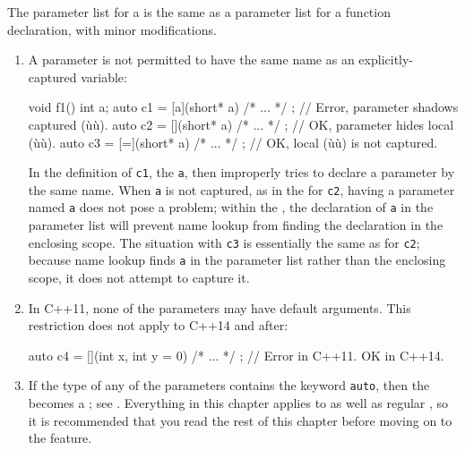 The parameter list for a  is the same as a
parameter list for a function declaration, with minor modifications.

\begin{enumerate}
\item{A parameter is not permitted to have the same name as an explicitly-captured variable:

\begin{emcppslisting}
void f1()
{
    int a;
    auto c1 = [a](short* a){ /* ... */ };  // Error, parameter shadows captured (ù{}ù).
    auto c2 = [](short* a){ /* ... */ };   // OK, parameter hides local (ù{}ù).
    auto c3 = [=](short* a){ /* ... */ };  // OK, local (ù{}ù) is not captured.
}
\end{emcppslisting} 

In the definition of \lstinline!c1!, the 
 \lstinline!a!, then improperly tries to
declare a parameter by the same name. When \lstinline!a! is not captured,
as in the  for \lstinline!c2!, having a parameter
named \lstinline!a! does not pose a problem; within the , the declaration of \lstinline!a! in the parameter list will prevent
name lookup from finding the declaration in the enclosing scope. The
situation with \lstinline!c3! is essentially the same as for \lstinline!c2!;
because name lookup finds \lstinline!a! in the parameter list rather than
the enclosing scope, it does not attempt to capture it.}

\item{In C++11, none of the parameters may have default arguments. This restriction does not apply to C++14 and after:

\begin{emcppslisting}
auto c4 = [](int x, int y = 0){ /* ... */ };  // Error in C++11.  OK in C++14.
\end{emcppslisting}
}

\item{If the type of any of the parameters contains the keyword \lstinline!auto!, then the  becomes a ; see . Everything in this chapter applies to  as well as regular , so it is recommended that you read the rest of this chapter before moving on to the  feature.}
\end{enumerate}


